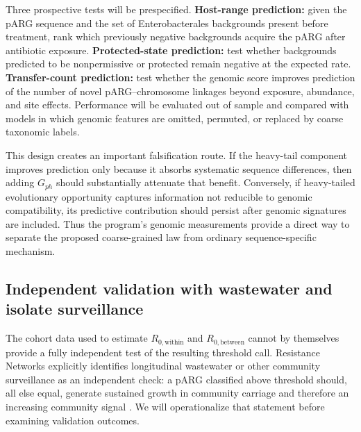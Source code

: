 \documentclass[12pt,a4paper]{article}
\newcommand{\Rwithin}{R_{0,\mathrm{within}}}
\newcommand{\Rbetween}{R_{0,\mathrm{between}}}
\begin{document}
Three prospective tests will be prespecified. \textbf{Host-range prediction:} given the pARG sequence and the set of Enterobacterales backgrounds present before treatment, rank which previously negative backgrounds acquire the pARG after antibiotic exposure. \textbf{Protected-state prediction:} test whether backgrounds predicted to be nonpermissive or protected remain negative at the expected rate. \textbf{Transfer-count prediction:} test whether the genomic score improves prediction of the number of novel pARG--chromosome linkages beyond exposure, abundance, and site effects. Performance will be evaluated out of sample and compared with models in which genomic features are omitted, permuted, or replaced by coarse taxonomic labels.

This design creates an important falsification route. If the heavy-tail component improves prediction only because it absorbs systematic sequence differences, then adding $G_{ph}$ should substantially attenuate that benefit. Conversely, if heavy-tailed evolutionary opportunity captures information not reducible to genomic compatibility, its predictive contribution should persist after genomic signatures are included. Thus the program's genomic measurements provide a direct way to separate the proposed coarse-grained law from ordinary sequence-specific mechanism.

\subsection{Independent validation with wastewater and isolate surveillance}
\label{sec:wastewater_validation}

The cohort data used to estimate $\Rwithin$ and $\Rbetween$ cannot by themselves provide a fully independent test of the resulting threshold call. Resistance Networks explicitly identifies longitudinal wastewater or other community surveillance as an independent check: a pARG classified above threshold should, all else equal, generate sustained growth in community carriage and therefore an increasing community signal \citep{wellcome2026}. We will operationalize that statement before examining validation outcomes.
\end{document}
